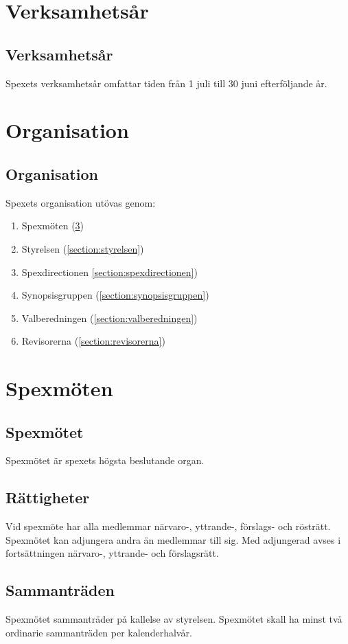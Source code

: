\documentclass[a4paper]{article}
\begin{document}
\section{Verksamhetsår}
\subsection{Verksamhetsår}
Spexets verksamhetsår omfattar tiden från 1 juli till 30 juni efterföljande år.

\section{Organisation}
\subsection{Organisation}
Spexets organisation utövas genom:

\begin{enumerate}
  \item Spexmöten (\ref{section:spexmöten})
  \item Styrelsen (\ref{section:styrelsen})
  \item Spexdirectionen \ref{section:spexdirectionen})
  \item Synopsisgruppen (\ref{section:synopsisgruppen})
  \item Valberedningen (\ref{section:valberedningen})
  \item Revisorerna (\ref{section:revisorerna})
\end{enumerate}

\section{Spexmöten}
\label{section:spexmöten}

\subsection{Spexmötet}
Spexmötet är spexets högsta beslutande organ.

\subsection{Rättigheter}
Vid spexmöte har alla medlemmar närvaro-, yttrande-, förslags- och rösträtt. Spexmötet kan adjungera andra än medlemmar till sig. Med adjungerad avses i fortsättningen närvaro-, yttrande- och förslagsrätt.

\subsection{Sammanträden}
Spexmötet sammanträder på kallelse av styrelsen. Spexmötet skall ha minst två ordinarie sammanträden per kalenderhalvår.
\end{document}
